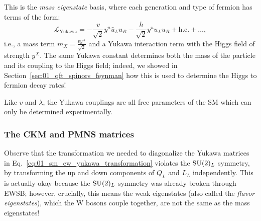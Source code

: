 This is the \textit{mass eigenstate} basis, where each generation and type of fermion has terms of the form:
\begin{equation}
	\label{eq:01_sm_ew_yukawa_mass}
	\mathcal{L}_{\mathrm{Yukawa}} = -\frac{v}{\sqrt{2}} y^u \bar u_L u_R - \frac{h}{\sqrt{2}} y^u u_L u_R + \text{h.c.} + \ldots,
\end{equation}
i.e., a mass term $m_X = \frac{v y^X}{\sqrt{2}}$ and a Yukawa interaction term with the Higgs field of strength $y^X$.
The same Yukawa constant determines both the mass of the particle and its coupling to the Higgs field;
indeed, we showed in Section~\ref{sec:01_qft_spinors_feynman} how this is used to determine the Higgs to fermion decay rates!

Like $v$ and $\lambda$, the Yukawa couplings are all free parameters of the SM which can only be determined experimentally.

\subsubsection{The CKM and PMNS matrices}

Observe that the transformation we needed to diagonalize the Yukawa matrices in Eq.~\ref{eq:01_sm_ew_yukawa_transformation} violates the $\SU[2]_L$ symmetry, by transforming the up and down components of $Q_L$ and $L_L$ independently.
This is actually okay because the $\SU[2]_L$ symmetry was already broken through EWSB; however, crucially, this means the weak eigenstates (also called the \textit{flavor eigenstates}), which the W bosons couple together, are not the same as the mass eigenstates!

